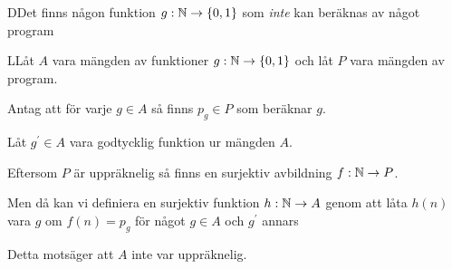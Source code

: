 \begin{theo}
  DDet finns någon funktion $g:\mathbb{N}\to\{0,1\}$ som \textit{inte} kan beräknas av något program
\end{theo}
\par\bigskip
\begin{prf}
  LLåt $A$ vara mängden av funktioner $g:\mathbb{N}\to\{0,1\}$ och låt $P$ vara mängden av program.\par
  \noindent Antag att för varje $g\in A$ så finns $p_g\in P$ som beräknar $g$.\par
  \noindent Låt $g^{\prime}\in A$ vara godtycklig funktion ur mängden $A$.
  \par\bigskip
  \noindent Eftersom $P$ är uppräknelig så finns en surjektiv avbildning $f:\mathbb{N}\to P$.\par
  \noindent Men då kan vi definiera en surjektiv funktion $h:\mathbb{N}\to A$ genom att låta $h(n)$ vara $g$ om $f(n) = p_g$ för något $g\in A$ och $g^{\prime}$ annars
  \par\bigskip
  \noindent Detta motsäger att $A$ inte var uppräknelig.
\end{prf}
\par\bigskip
